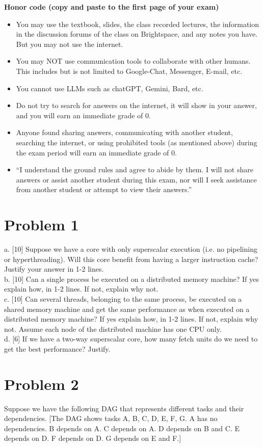 \documentclass{article}
\begin{document}
\textbf{Honor code (copy and paste to the first page of your exam)}
\begin{itemize}
    \item You may use the textbook, slides, the class recorded lectures, the information in the discussion forums of the class on Brightspace, and any notes you have. But you may not use the internet.
    \item You may NOT use communication tools to collaborate with other humans. This includes but is not limited to Google-Chat, Messenger, E-mail, etc.
    \item You cannot use LLMs such as chatGPT, Gemini, Bard, etc.
    \item Do not try to search for answers on the internet, it will show in your answer, and you will earn an immediate grade of 0.
    \item Anyone found sharing answers, communicating with another student, searching the internet, or using prohibited tools (as mentioned above) during the exam period will earn an immediate grade of 0.
    \item “I understand the ground rules and agree to abide by them. I will not share answers or assist another student during this exam, nor will I seek assistance from another student or attempt to view their answers.”
\end{itemize}


\section*{Problem 1}
a. [10] Suppose we have a core with only superscalar execution (i.e. no pipelining or hyperthreading). Will this core benefit from having a larger instruction cache? Justify your answer in 1-2 lines. \\
b. [10] Can a single process be executed on a distributed memory machine? If yes explain how, in 1-2 lines. If not, explain why not. \\
c. [10] Can several threads, belonging to the same process, be executed on a shared memory machine and get the same performance as when executed on a distributed memory machine? If yes explain how, in 1-2 lines. If not, explain why not. Assume each node of the distributed machine has one CPU only. \\
d. [6] If we have a two-way superscalar core, how many fetch units do we need to get the best performance? Justify.


\section*{Problem 2}
Suppose we have the following DAG that represents different tasks and their dependencies.  [The DAG shows tasks A, B, C, D, E, F, G. A has no dependencies. B depends on A. C depends on A. D depends on B and C. E depends on D. F depends on D. G depends on E and F.]
\end{document}
